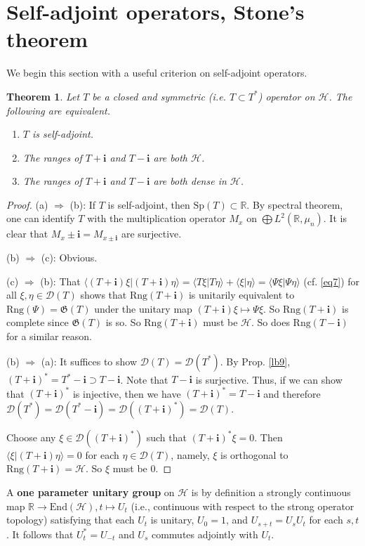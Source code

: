 \documentclass[12pt,b5paper,notitlepage]{article}
\theoremstyle{definition}
\theoremstyle{plain}
\newtheorem{thm}[df]{Theorem}
\newcommand{\fk}{\mathfrak}
\newcommand{\mc}{\mathcal}
\newcommand{\End}{\mathrm{End}} %
\newcommand{\Dom}{\scr D}
\newcommand{\bk}[1]{\langle {#1}\rangle}
\newcommand{\scr}{\mathscr}
\newcommand{\im}{\mathbf{i}}
\newcommand{\Rbb}{\mathbb R}
\newcommand{\Sp}{\mathrm{Sp}}
\newcommand{\Rng}{\mathrm{Rng}}
\numberwithin{equation}{section}
\begin{document}
\section{Self-adjoint operators, Stone's theorem}


We begin this section with a useful criterion on self-adjoint operators.

\begin{thm}
Let $T$ be a closed and symmetric (i.e. $T\subset T^*$) operator on $\mc H$. The following are equivalent.
\begin{enumerate}[label=(\alph*)]
\item $T$ is self-adjoint.
\item The ranges of $T+\im$ and $T-\im$ are both $\mc H$.
\item  The ranges of $T+\im$ and $T-\im$ are both dense in $\mc H$.
\end{enumerate}
\end{thm}


\begin{proof}
(a) $\Rightarrow$ (b): If $T$ is self-adjoint, then $\Sp(T)\subset \Rbb$. By spectral theorem, one can identify $T$ with the multiplication operator $M_x$ on $\bigoplus L^2(\Rbb,\mu_n)$. It is clear that $M_x\pm\im=M_{x\pm\im}$ are surjective.

(b) $\Rightarrow$ (c): Obvious.

(c) $\Rightarrow$ (b): That $\bk{(T+\im)\xi|(T+\im)\eta}=\bk{T\xi|T\eta}+\bk{\xi|\eta}=\bk{\Psi\xi|\Psi\eta}$ (cf. \eqref{eq7}) for all $\xi,\eta\in\Dom(T)$ shows that $\Rng(T+\im)$ is unitarily equivalent to $\Rng(\Psi)=\fk G(T)$ under the unitary map $(T+\im)\xi\mapsto \Psi\xi$. So $\Rng(T+\im)$ is complete since $\fk G(T)$ is so. So $\Rng(T+\im)$ must be $\mc H$. So does $\Rng(T-\im)$ for a similar reason.

(b) $\Rightarrow$ (a): It suffices to show $\Dom(T)=\Dom(T^*)$. By Prop. \ref{lb9}, $(T+\im)^*=T^*-\im\supset T-\im$. Note that $T-\im$ is surjective. Thus, if we can show that $(T+\im)^*$ is injective, then we have $(T+\im)^*=T-\im$ and therefore $\Dom(T^*)=\Dom(T^*-\im)=\Dom((T+\im)^*)=\Dom(T)$.

Choose any $\xi\in\Dom((T+\im)^*)$ such that $(T+\im)^*\xi=0$. Then $\bk{\xi|(T+\im)\eta}=0$ for each $\eta\in\Dom(T)$, namely, $\xi$ is orthogonal to $\Rng(T+\im)=\mc H$. So $\xi$ must be $0$.
\end{proof}


A \textbf{one parameter unitary group} on $\mc H$ is by definition a strongly continuous map $\Rbb\rightarrow\End(\mc H),t\mapsto U_t$ (i.e., continuous with respect to the strong operator topology) satisfying that each $U_t$ is unitary, $U_0=1$, and $U_{s+t}=U_sU_t$ for each $s,t$. It follows that $U_t^*=U_{-t}$ and $U_s$ commutes adjointly with $U_t$.
\end{document}
